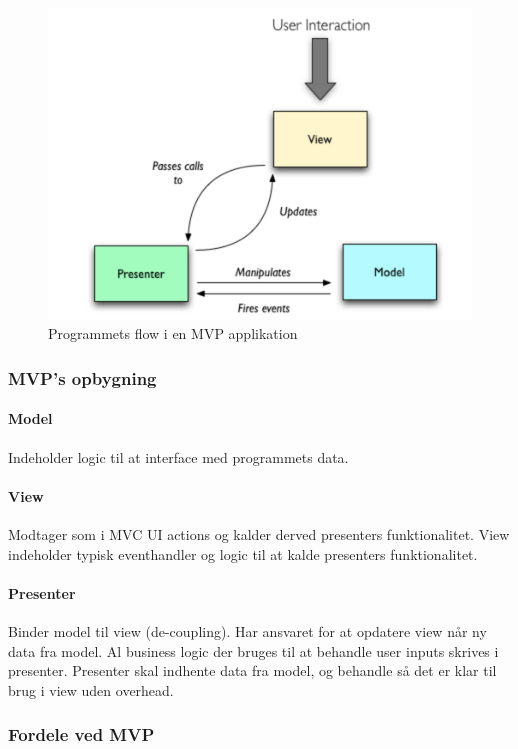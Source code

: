 \begin{figure}[h]
	\centering
	\includegraphics[width=0.8\linewidth]{figs/mvpFlow}
	\caption{Programmets flow i en MVP applikation}
	\label{fig:mvpFlow}
\end{figure}

\subsubsection{MVP's opbygning}

\paragraph{Model} Indeholder logic til at interface med programmets data.

\paragraph{View} Modtager som i MVC UI actions og kalder derved presenters funktionalitet. View indeholder typisk eventhandler og logic til at kalde presenters funktionalitet.

\paragraph{Presenter} Binder model til view (de-coupling). Har ansvaret for at opdatere view når ny data fra model. Al business logic der bruges til at behandle user inputs skrives i presenter. Presenter skal indhente data fra model, og behandle så det er klar til brug i view uden overhead.

\subsubsection{Fordele ved MVP}

